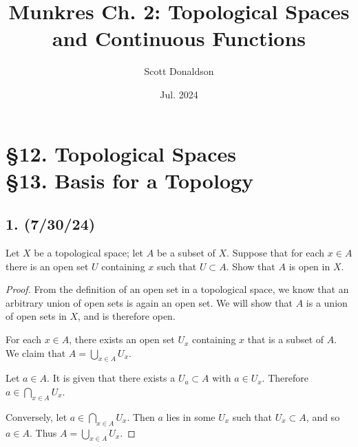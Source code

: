 \documentclass{article}
\title{Munkres Ch. 2: Topological Spaces and Continuous Functions}
\author{Scott Donaldson}
\date{Jul. 2024}
\begin{document}
\maketitle

\section*{§12. Topological Spaces\\§13. Basis for a Topology}

\subsection*{1. (7/30/24)}

Let $X$ be a topological space; let $A$ be a subset of $X$. Suppose that for each $x \in A$ there is an open set $U$ containing $x$ such that $U \subset A$. Show that $A$ is open in $X$.

\begin{proof}
    From the definition of an open set in a topological space, we know that an arbitrary union of open sets is again an open set. We will show that $A$ is a union of open sets in $X$, and is therefore open.

    For each $x \in A$, there exists an open set $U_x$ containing $x$ that is a subset of $A$. We claim that $A = \bigcup_{x \in A} U_x$.

    Let $a \in A$. It is given that there exists a $U_a \subset A$ with $a \in U_x$. Therefore $a \in \bigcap_{x \in A} U_x$.

    Conversely, let $a \in \bigcap_{x \in A} U_x$. Then $a$ lies in some $U_x$ such that $U_x \subset A$, and so $a \in A$. Thus $A = \bigcup_{x \in A} U_x$.
\end{proof}
\end{document}
